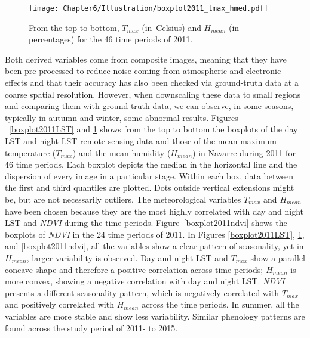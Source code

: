 \begin{figure}[ht]%
\centering
  \texttt{[image: Chapter6/Illustration/boxplot2011\_tmax\_hmed.pdf]}%

  \caption{From the top to bottom, $T_{max}$ (in~Celsius) and $H_{mean}$ (in percentages) for the 46 time periods of 2011.}\label{boxplot2011rainfall}%
\end{figure}



Both derived variables come from composite images, meaning that they have been pre-processed to reduce noise coming
from atmospheric and electronic effects and that their accuracy has also been checked via ground-truth data at a coarse spatial resolution.
However, when downscaling these data to small regions and comparing them with ground-truth data, we can observe, in some seasons,
typically in autumn and winter, some abnormal results.
Figures ~\ref{boxplot2011LST} and \ref{boxplot2011rainfall} shows from the top to bottom the boxplots of the day LST and night LST remote sensing data and those of the mean maximum temperature
($T_{max}$) and the mean humidity ($H_{mean}$) in Navarre during 2011 for 46 time periods.
 Each boxplot depicts the median in the horizontal line and the dispersion of every image in a particular stage.
 Within each box, data between the first and third quantiles are plotted. Dots outside vertical extensions might be, but are not necessarily outliers.
 The meteorological variables $T_{max}$ and $H_{mean}$ have been chosen because
they are the most highly correlated with day and night LST and \emph{NDVI} during the time periods. Figure~\ref{boxplot2011ndvi} shows the boxplots of \emph{NDVI} in the 24 time periods of 2011.
In Figures \ref{boxplot2011LST}, \ref{boxplot2011rainfall}, and \ref{boxplot2011ndvi}, all the variables show a clear pattern of seasonality, yet in $H_{mean}$, larger variability is observed.
Day and night LST and $T_{max}$ show a parallel concave shape and therefore a positive correlation across time periods; $H_{mean}$ is more convex, showing a negative correlation
with day and night LST. \emph{NDVI} presents a different seasonality pattern, which is negatively correlated with $T_{max}$ and positively correlated with $H_{mean}$ across
the time periods. In summer, all the variables are more stable and show less variability. Similar phenology patterns are found across the study period of 2011- to 2015.

